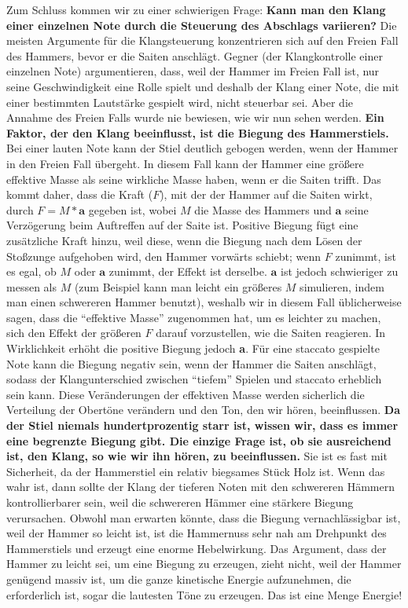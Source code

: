 Zum Schluss kommen wir zu einer schwierigen Frage: \textbf{Kann man den Klang einer einzelnen Note durch die Steuerung des Abschlags variieren?}
Die meisten Argumente für die Klangsteuerung konzentrieren sich auf den Freien Fall des Hammers, bevor er die Saiten anschlägt.
Gegner (der Klangkontrolle einer einzelnen Note) argumentieren, dass, weil der Hammer im Freien Fall ist, nur seine Geschwindigkeit eine Rolle spielt und deshalb der Klang einer Note, die mit einer bestimmten Lautstärke gespielt wird, nicht steuerbar sei.
Aber die Annahme des Freien Falls wurde nie bewiesen, wie wir nun sehen werden.
\textbf{Ein Faktor, der den Klang beeinflusst, ist die Biegung des Hammerstiels.}
Bei einer lauten Note kann der Stiel deutlich gebogen werden, wenn der Hammer in den Freien Fall übergeht.
In diesem Fall kann der Hammer eine größere effektive Masse als seine wirkliche Masse haben, wenn er die Saiten trifft.
Das kommt daher, dass die Kraft ($F$), mit der der Hammer auf die Saiten wirkt, durch $F = M*\textbf{a}$ gegeben ist, wobei $M$ die Masse des Hammers und $\textbf{a}$ seine Verzögerung beim Auftreffen auf der Saite ist.
Positive Biegung fügt eine zusätzliche Kraft hinzu, weil diese, wenn die Biegung nach dem Lösen der Stoßzunge aufgehoben wird, den Hammer vorwärts schiebt; wenn $F$ zunimmt, ist es egal, ob $M$ oder $\textbf{a}$ zunimmt, der Effekt ist derselbe.
$\textbf{a}$ ist jedoch schwieriger zu messen als $M$ (zum Beispiel kann man leicht ein größeres $M$ simulieren, indem man einen schwereren Hammer benutzt), weshalb wir in diesem Fall üblicherweise sagen, dass die \enquote{effektive Masse} zugenommen hat, um es leichter zu machen, sich den Effekt der größeren $F$ darauf vorzustellen, wie die Saiten reagieren.
In Wirklichkeit erhöht die positive Biegung jedoch \textbf{a}.
Für eine staccato gespielte Note kann die Biegung negativ sein, wenn der Hammer die Saiten anschlägt, sodass der Klangunterschied zwischen \enquote{tiefem} Spielen und staccato erheblich sein kann.
Diese Veränderungen der effektiven Masse werden sicherlich die Verteilung der Obertöne verändern und den Ton, den wir hören, beeinflussen.
\textbf{Da der Stiel niemals hundertprozentig starr ist, wissen wir, dass es immer eine begrenzte Biegung gibt.
Die einzige Frage ist, ob sie ausreichend ist, den Klang, so wie wir ihn hören, zu beeinflussen.}
Sie ist es fast mit Sicherheit, da der Hammerstiel ein relativ biegsames Stück Holz ist.
Wenn das wahr ist, dann sollte der Klang der tieferen Noten mit den schwereren Hämmern kontrollierbarer sein, weil die schwereren Hämmer eine stärkere Biegung verursachen.
Obwohl man erwarten könnte, dass die Biegung vernachlässigbar ist, weil der Hammer so leicht ist, ist die Hammernuss sehr nah am Drehpunkt des Hammerstiels und erzeugt eine enorme Hebelwirkung.
Das Argument, dass der Hammer zu leicht sei, um eine Biegung zu erzeugen, zieht nicht, weil der Hammer genügend massiv ist, um die ganze kinetische Energie aufzunehmen, die erforderlich ist, sogar die lautesten Töne zu erzeugen.
Das ist eine Menge Energie!

